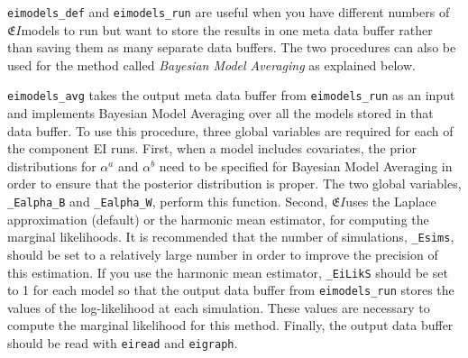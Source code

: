 \documentclass[11pt,titlepage]{article}
\newcommand{\EI}{\ensuremath{{\mathfrak EI}}}
\begin{document}
\texttt{eimodels\_def} and \texttt{eimodels\_run} are useful when you
have different numbers of \EI models to run but want to store the
results in one meta data buffer rather than saving them as many
separate data buffers. The two procedures can also be used for the
method called \textit{Bayesian Model Averaging} as explained below.

\texttt{eimodels\_avg} takes the output meta data buffer from
\texttt{eimodels\_run} as an input and implements Bayesian Model
Averaging over all the models stored in that data buffer. To use this
procedure, three global variables are required for each of the
component EI runs.  First, when a model includes covariates, the prior
distributions for $\alpha^a$ and $\alpha^b$ need to be specified for
Bayesian Model Averaging in order to ensure that the posterior
distribution is proper. The two global variables, \texttt{\_Ealpha\_B}
and \texttt{\_Ealpha\_W}, perform this function.  Second, \EI uses the
Laplace approximation (default) or the harmonic mean estimator,
for computing the marginal likelihoods. It is recommended that the
number of simulations, \texttt{\_Esims}, should be set to a relatively
large number in order to improve the precision of this estimation.  If
you use the harmonic mean estimator, \texttt{\_EiLikS} should be set
to 1 for each model so that the output data buffer from
\texttt{eimodels\_run} stores the values of the log-likelihood at each
simulation. These values are necessary to compute the marginal
likelihood for this method. Finally, the output data buffer should be
read with \texttt{eiread} and \texttt{eigraph}.
\end{document}
